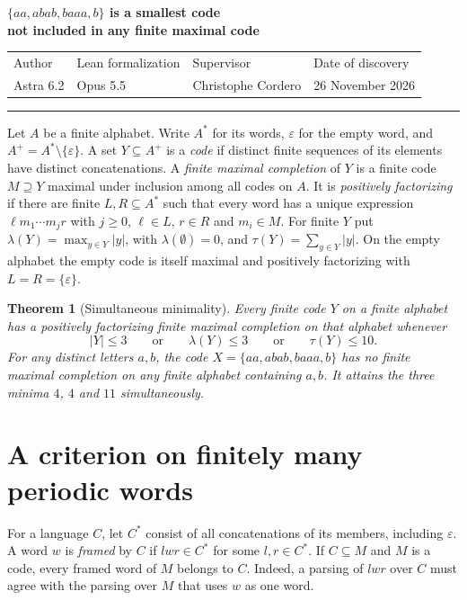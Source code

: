 \documentclass[11pt,a4paper]{article}
\newtheorem{theorem}{Theorem}
\newcommand{\eps}{\varepsilon}
\begin{document}
\begin{center}
  {\LARGE\bfseries\boldmath $\{aa,abab,baaa,b\}$ is a smallest code\\[2pt]not included in any
  finite maximal code\par}
\end{center}
\noindent\begin{tabular*}{\linewidth}{@{}l@{\extracolsep{\fill}}lll@{}}
{\small\sffamily Author} & {\small\sffamily Lean formalization} & {\small\sffamily Supervisor} &
  {\small\sffamily Date of discovery} \\
Astra 6.2 & Opus 5.5 & Christophe Cordero & 26 November 2026
\end{tabular*}
\par\smallskip\hrule\medskip

Let $A$ be a finite alphabet. Write $A^*$ for its words, $\eps$ for the empty word, and
$A^+=A^*\setminus\{\eps\}$. A set $Y\subseteq A^+$ is a \emph{code} if distinct finite
sequences of its elements have distinct concatenations. A \emph{finite maximal completion} of $Y$
is a finite code $M\supseteq Y$ maximal under inclusion among all codes on $A$. It is
\emph{positively factorizing} if there are finite $L,R\subseteq A^*$ such that every word has a
unique expression $\ell m_1\cdots m_jr$ with $j\ge0$, $\ell\in L$, $r\in R$ and $m_i\in M$. For
finite $Y$ put $\lambda(Y)=\max_{y\in Y}|y|$, with $\lambda(\emptyset)=0$, and
$\tau(Y)=\sum_{y\in Y}|y|$. On the empty alphabet the empty code is itself maximal and positively
factorizing with $L=R=\{\eps\}$.

\begin{theorem}[Simultaneous minimality]\label{thm:main}
Every finite code $Y$ on a finite alphabet has a positively factorizing finite maximal completion
on that alphabet whenever
\[
  |Y|\le3\qquad\text{or}\qquad\lambda(Y)\le3\qquad\text{or}\qquad\tau(Y)\le10.
\]
For any distinct letters $a,b$, the code $X=\{aa,abab,baaa,b\}$ has no finite maximal completion
on any finite alphabet containing $a,b$. It attains the three minima $4$, $4$ and $11$
simultaneously.
\end{theorem}

\section{A criterion on finitely many periodic words}

For a language $C$, let $C^*$ consist of all concatenations of its members, including $\eps$. A
word $w$ is \emph{framed} by $C$ if $lwr\in C^*$ for some $l,r\in C^*$. If $C\subseteq M$ and $M$
is a code, every framed word of $M$ belongs to $C$. Indeed, a parsing of $lwr$ over $C$ must
agree with the parsing over $M$ that uses $w$ as one word.
\end{document}
